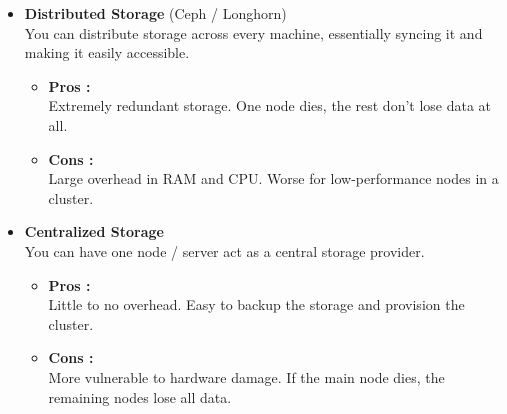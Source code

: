 \begin{itemize}
	\item \textbf{Distributed Storage} (Ceph / Longhorn) \\
	You can distribute storage across every machine, essentially syncing it and making it easily accessible. \\
	
	\begin{itemize}
		\item \textbf{Pros :} \\
		Extremely redundant storage. One node dies, the rest don't lose data at all.
		\item \textbf{Cons :} \\
		Large overhead in RAM and CPU. Worse for low-performance nodes in a cluster.
	\end{itemize}
	
	\item \textbf{Centralized Storage} \\
	You can have one node / server act as a central storage provider.
	
	\begin{itemize}
		\item \textbf{Pros :} \\
		Little to no overhead. Easy to backup the storage and provision the cluster.
		\item \textbf{Cons :} \\
		More vulnerable to hardware damage. If the main node dies, the remaining nodes lose all data. 
	\end{itemize}
\end{itemize}